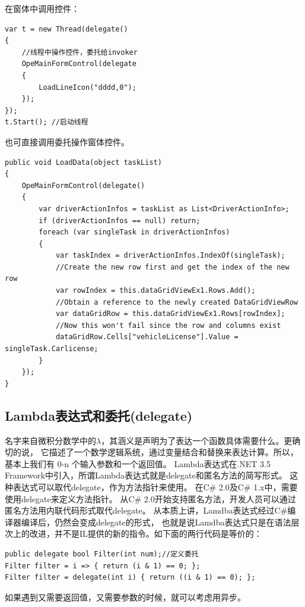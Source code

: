 \documentclass{book}
\begin{document}
在窗体中调用控件：

\begin{lstlisting}[language={[Sharp]C}]
var t = new Thread(delegate()
{
	//线程中操作控件，委托给invoker
	OpeMainFormControl(delegate
	{
		LoadLineIcon("dddd,0");
	});
});
t.Start(); //启动线程
\end{lstlisting}

也可直接调用委托操作窗体控件。

\begin{lstlisting}[language={[Sharp]C}]
public void LoadData(object taskList)
{
	OpeMainFormControl(delegate()
	{
		var driverActionInfos = taskList as List<DriverActionInfo>;
		if (driverActionInfos == null) return;
		foreach (var singleTask in driverActionInfos)
		{
			var taskIndex = driverActionInfos.IndexOf(singleTask);
			//Create the new row first and get the index of the new row
			var rowIndex = this.dataGridViewEx1.Rows.Add();
			//Obtain a reference to the newly created DataGridViewRow 
			var dataGridRow = this.dataGridViewEx1.Rows[rowIndex];
			//Now this won't fail since the row and columns exist 
			dataGridRow.Cells["vehicleLicense"].Value = singleTask.Carlicense;			
		}
	});
}
\end{lstlisting}

\subsection{Lambda表达式和委托(delegate)}

名字来自微积分数学中的$\lambda$，其涵义是声明为了表达一个函数具体需要什么。更确切的说，
它描述了一个数学逻辑系统，通过变量结合和替换来表达计算。所以，基本上我们有 0-n 个输入参数和一个返回值。
Lambda表达式在.NET 3.5 Framework中引入，所谓Lambda表达式就是delegate和匿名方法的简写形式。
这种表达式可以取代delegate，作为方法指针来使用。
在C\# 2.0及C\# 1.x中，需要使用delegate来定义方法指针。
从C\# 2.0开始支持匿名方法，开发人员可以通过匿名方法用内联代码形式取代delegate。
从本质上讲，Lamdba表达式经过C\#编译器编译后，仍然会变成delegate的形式，
也就是说Lamdba表达式只是在语法层次上的改进，并不是IL提供的新的指令。如下面的两行代码是等价的：

\begin{lstlisting}[language={[Sharp]C}]
public delegate bool Filter(int num);//定义委托
Filter filter = i => { return (i & 1) == 0; };        
Filter filter = delegate(int i) { return ((i & 1) == 0); };
\end{lstlisting}

如果遇到又需要返回值，又需要参数的时候，就可以考虑用异步。
\end{document}
